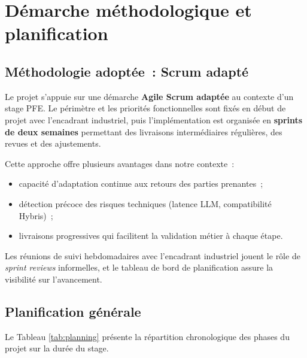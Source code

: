 \section{Démarche méthodologique et planification}

\subsection{Méthodologie adoptée~: Scrum adapté}
Le projet s'appuie sur une démarche \textbf{Agile Scrum adaptée} au contexte d'un stage PFE. Le périmètre et les priorités fonctionnelles sont fixés en début de projet avec l'encadrant industriel, puis l'implémentation est organisée en \textbf{sprints de deux semaines} permettant des livraisons intermédiaires régulières, des revues et des ajustements.

Cette approche offre plusieurs avantages dans notre contexte~:
\begin{itemize}
  \item capacité d'adaptation continue aux retours des parties prenantes~;
  \item détection précoce des risques techniques (latence LLM, compatibilité Hybris)~;
  \item livraisons progressives qui facilitent la validation métier à chaque étape.
\end{itemize}

Les réunions de suivi hebdomadaires avec l'encadrant industriel jouent le rôle de \textit{sprint reviews} informelles, et le tableau de bord de planification assure la visibilité sur l'avancement.

\subsection{Planification générale}
Le Tableau \ref{tab:planning} présente la répartition chronologique des phases du projet sur la durée du stage.

